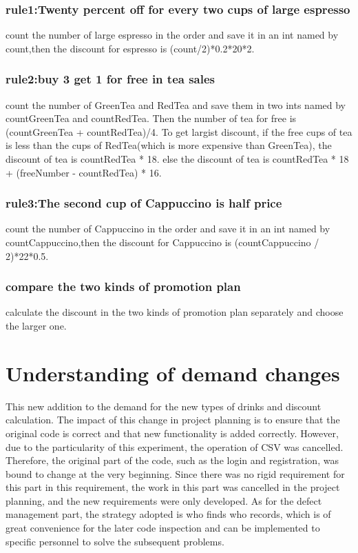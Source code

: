 \documentclass[a4paper]{report}
\begin{document}
\subsection{rule1:Twenty percent off for every two cups of large espresso}
count the number of large espresso in the order and save it in an int named by count,then the discount for espresso is (count/2)*0.2*20*2.
\subsection{rule2:buy 3 get 1 for free in tea sales}
count the number of GreenTea and RedTea and  save them in two ints named by countGreenTea and countRedTea.
Then the number of tea for free is (countGreenTea + countRedTea)/4.
To get largist discount, if the free cups of tea is less than the cups of RedTea(which is more expensive than GreenTea),
the discount of tea is countRedTea * 18. else the discount of tea is countRedTea * 18 + (freeNumber - countRedTea) * 16.
\subsection{rule3:The second cup of Cappuccino is half price}
count the number of Cappuccino in the order and save it in an int named by countCappuccino,then the discount for Cappuccino is (countCappuccino / 2)*22*0.5.
\subsection{compare the two kinds of promotion plan}
calculate the discount in the two kinds of promotion plan separately and choose the larger one.


\chapter{Understanding of demand changes}


This new addition to the demand for the new types of drinks and discount calculation. The impact of this change in project planning is to ensure that the original code is correct and that new functionality is added correctly. However, due to the particularity of this experiment, the operation of CSV was cancelled. Therefore, the original part of the code, such as the login and registration, was bound to change at the very beginning. Since there was no rigid requirement for this part in this requirement, the work in this part was cancelled in the project planning, and the new requirements were only developed. As for the defect management part, the strategy adopted is who finds who records, which is of great convenience for the later code inspection and can be implemented to specific personnel to solve the subsequent problems.
\end{document}
